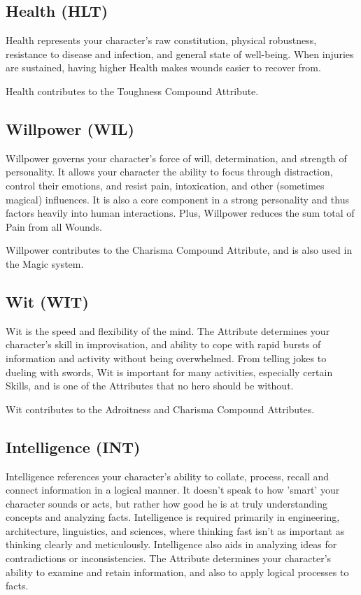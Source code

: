 \documentclass[oneside,11pt,english]{book}
\begin{document}
\subsection*{Health (HLT)}
Health represents your character's raw constitution, physical robustness, resistance to disease and 
infection, and general state of well-being. When injuries are sustained, having higher Health makes 
wounds easier to recover from. 


Health contributes to the Toughness Compound Attribute. 
\subsection*{Willpower (WIL)}
Willpower governs your character’s force of will, determination, and strength of personality. 
It allows your character the ability to focus through distraction, control their emotions, and resist pain, 
intoxication, and other (sometimes magical) influences. It is also a core component in a strong personality 
and thus factors heavily into human interactions. Plus, Willpower reduces the sum total of Pain from all 
Wounds. 

 
Willpower contributes to the Charisma Compound Attribute, and is also used in the Magic system. 
\subsection*{Wit (WIT)}
Wit is the speed and flexibility of the mind. The Attribute determines your character’s skill in 
improvisation, and ability to cope with rapid bursts of information and activity without being 
overwhelmed. From telling jokes to dueling with swords, Wit is important for many activities, especially 
certain Skills, and is one of the Attributes that no hero should be without. 

 
Wit contributes to the Adroitness and Charisma Compound Attributes. 
\subsection*{Intelligence (INT)}
Intelligence references your character's ability to collate, process, recall and connect information in a 
logical manner. It doesn’t speak to how 'smart' your character sounds or acts, but rather how good he is at 
truly understanding concepts and analyzing facts. Intelligence is required primarily in engineering, 
architecture, linguistics, and sciences, where thinking fast isn't as important as thinking clearly and 
meticulously. Intelligence also aids in analyzing ideas for contradictions or inconsistencies. The Attribute 
determines your character’s ability to examine and retain information, and also to apply logical processes 
to facts. 
\end{document}
